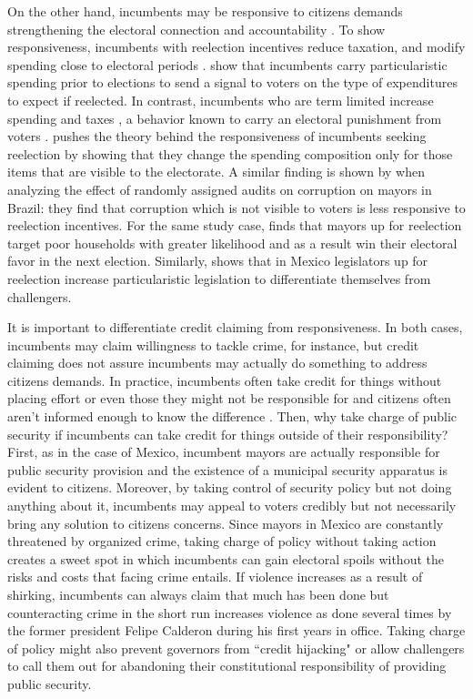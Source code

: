 \documentclass[12pt]{amsart}
\numberwithin{equation}{section}
\theoremstyle{definition}
\theoremstyle{definition}
\theoremstyle{definition}
\begin{document}
On the other hand, incumbents may be responsive to citizens demands strengthening the electoral connection and accountability \citep{mayhew_1974, manin_etal_1999, cox_katz_2002}. To show responsiveness, incumbents with reelection incentives reduce taxation, and modify spending close to electoral periods \citep{Rogoff_1988, Rogoff_1990, klein_sakurai_2015}. \citet{Drazen_eslava_2005} show that incumbents carry particularistic spending prior to elections to send a signal to voters on the type of expenditures to expect if reelected. In contrast, incumbents who are term limited increase spending and taxes \citep{Besley_case_1995}, a behavior known to carry an electoral punishment from voters \citep{peltzman_1992}. \citet{akhmedov_2004} pushes the theory behind the responsiveness of incumbents seeking reelection by showing that they change the spending composition only for those items that are visible to the electorate. A similar finding is shown by \citet{ferraz_finan_2011} when analyzing the effect of randomly assigned audits on corruption on mayors in Brazil: they find that corruption which is not visible to voters is less responsive to reelection incentives. For the same study case, \citet{frey_2021} finds that mayors up for reelection target poor households with greater likelihood and as a result win their electoral favor in the next election. Similarly, \citet{motolinia_2020} shows that in Mexico legislators up for reelection increase particularistic legislation to differentiate themselves from challengers. 

It is important to differentiate  credit claiming from responsiveness. In both cases, incumbents may claim willingness to tackle crime, for instance, but credit claiming does not assure incumbents may actually do something to address citizens demands. In practice, incumbents often take credit for things without placing effort or even those they might not be responsible for and citizens often aren't informed enough to know the difference \citep{benedictis_kessner_2020}. Then, why take charge of public security if incumbents can take credit for things outside of their responsibility? First, as in the case of Mexico, incumbent mayors are actually responsible for public security provision and the existence of a municipal security apparatus is evident to citizens. Moreover, by taking control of security policy but not doing anything about it, incumbents may appeal to voters credibly but not necessarily bring any solution to citizens concerns. Since mayors in Mexico are constantly threatened by organized crime, taking charge of policy without taking action creates a sweet spot in which incumbents can gain electoral spoils without the risks and costs that facing crime entails. If violence increases as a result of shirking, incumbents can always claim that much has been done but counteracting crime in the short run increases violence as done several times by the former president Felipe Calderon during his first years in office. Taking charge of policy might also prevent governors from ``credit hijacking" \citep{bueno_2017} or allow challengers to call them out for abandoning their constitutional responsibility of providing public security. 
\end{document}
